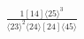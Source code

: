 \documentclass[varwidth, border=5pt]{standalone}
\begin{document}
\begin{my}
$\begin{gathered}
\scriptscriptstyle\frac{1[14]⟨25⟩^3}{⟨23⟩^2⟨24⟩[24]⟨45⟩}
\end{gathered}$
\end{my}
\end{document}
